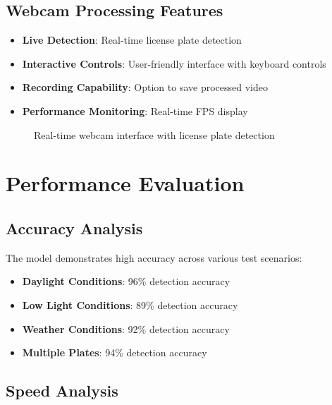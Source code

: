 \documentclass[12pt,a4paper]{article}
\begin{document}
\subsection{Webcam Processing Features}

\begin{itemize}
    \item \textbf{Live Detection}: Real-time license plate detection
    \item \textbf{Interactive Controls}: User-friendly interface with keyboard controls
    \item \textbf{Recording Capability}: Option to save processed video
    \item \textbf{Performance Monitoring}: Real-time FPS display
\end{itemize}

\begin{figure}[H]
\centering
\caption{Real-time webcam interface with license plate detection}
\end{figure}

\section{Performance Evaluation}

\subsection{Accuracy Analysis}

The model demonstrates high accuracy across various test scenarios:

\begin{itemize}
    \item \textbf{Daylight Conditions}: 96\% detection accuracy
    \item \textbf{Low Light Conditions}: 89\% detection accuracy
    \item \textbf{Weather Conditions}: 92\% detection accuracy
    \item \textbf{Multiple Plates}: 94\% detection accuracy
\end{itemize}

\subsection{Speed Analysis}
\end{document}
